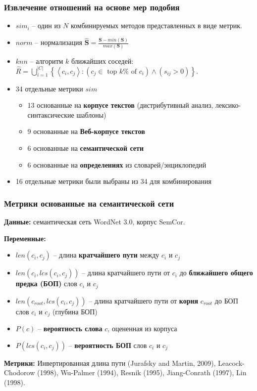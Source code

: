 \documentclass{beamer}
\begin{document}
\begin{frame}
\frametitle{Извлечение отношений на основе мер подобия}
\begin{itemize}
	\item $sim_i$ -- один из $N$ комбинируемых методов представленных в виде метрик.
	\item $norm$ -- нормализация $\hat{\mathbf{S}} = \frac{\mathbf{S}-min(\mathbf{S})}{max(\mathbf{S})}$	
	\item $knn$ -- алгоритм $k$ ближайших соседей:  $\hat{R}=\bigcup_{i=1}^{|C|}\left\{\left\langle c_i, c_j \right\rangle :  (c_j \in \text{ top }k\% \text{ of } c_i) \wedge (s_{ij} > 0) \right\}.$  

\item 34 отдельные метрики $sim$
\begin{itemize}
\item 13 основанные на \textbf{корпусе текстов} (дистрибутивный анализ, лексико-синтаксические шаблоны)
\item 9 основанные на \textbf{Веб-корпусе текстов}
\item 6 основанные на \textbf{семантической сети}
\item 6 основанные на \textbf{определениях} из словарей/энциклопедий    
\end{itemize}
\item 16 отдельные метрики были выбраны из 34 для комбинирования
\end{itemize}

\end{frame}


\begin{frame}
\frametitle{Метрики основанные на семантической сети}

 \textbf{Данные:} семантическая сеть WordNet 3.0, корпус SemCor.
	
 \textbf{Переменные:}
\begin{itemize}
\item $len(c_i,c_j)$ -- длина \textbf{кратчайшего пути} между $c_i$ и $c_j$
\item  $len(c_i, lcs(c_i,c_j))$ -- длина кратчайшего пути от $c_i$ до \textbf{ближайшего общего предка  (БОП)} слов $c_i$ и $c_j$
\item $len(c_{root}, lcs(c_i,c_j))$ -- длина кратчайшего пути от \textbf{корня} $c_{root}$ до БОП слов $c_i$ и $c_j$ (глубина БОП)
\item $P(c)$ --  \textbf{вероятность слова} $c$, оцененная из корпуса
\item  $P(lcs(c_i, c_j))$ -- \textbf{вероятность БОП} слов $c_i$ и $c_j$
\end{itemize}
	
 \textbf{Метрики:} Инвертированная длина пути (Jurafsky and Martin, 2009), Leacock-Chodorow (1998), Wu-Palmer (1994), 
 Resnik (1995), Jiang-Conrath (1997), Lin (1998).
  
\end{frame}
\end{document}
